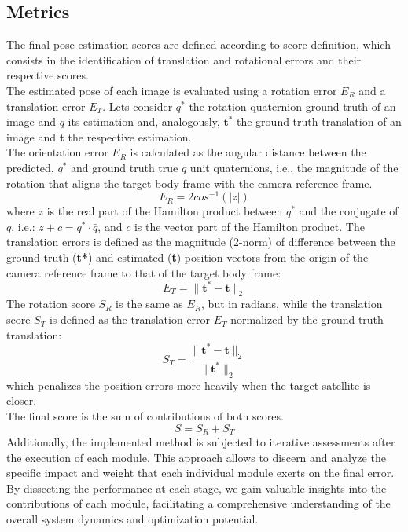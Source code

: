 \subsection{Metrics}
The final pose estimation scores are defined according to \cite{KPEC} score definition, which consists in the identification of translation and rotational errors and their respective scores.\\
The estimated pose of each image is evaluated using a rotation error $E_R$ and a translation error $E_T$. Lets consider $q^*$ the rotation quaternion ground truth of an image and $q$ its estimation and, analogously, $\textbf{t}^*$ the ground truth translation of an image and $\textbf{t}$ the respective estimation.\\
The orientation error $E_R$ is calculated as the angular distance between the predicted, $q^*$ and ground truth true $q$ unit quaternions, i.e., the magnitude of the rotation that aligns the target body frame with the camera reference frame.
\begin{equation}
    E_R = 2cos^{-1}(|z|)
\end{equation}
where $z$ is the real part of the Hamilton product between $q^*$ and the conjugate of $q$, i.e.: \(z + c = q^*\cdot \bar{q}\), and $c$ is the vector part of the Hamilton product.
The translation errors is defined as the magnitude (2-norm) of difference between the ground-truth (\textbf{t*}) and estimated (\textbf{t}) position vectors from the origin of the camera reference frame to that of the target body frame:
\begin{equation}
    E_T = \|\textbf{t}^*-\textbf{t}\|_2
\end{equation}
The rotation score $S_R$ is the same as $E_R$, but in radians, while the translation score $S_T$ is defined as the translation error $E_T$ normalized by the ground truth translation:
\begin{equation}
    S_T = \frac{\|\textbf{t}^*-\textbf{t}\|_2}{\|\textbf{t}^*\|_2}
\end{equation}
which penalizes the position errors more heavily when the target satellite is closer.\\
The final score is the sum of contributions of both scores.
\begin{equation}
    S = S_R + S_T
\end{equation}
Additionally, the implemented method is subjected to iterative assessments after the execution of each module. This approach allows to discern and analyze the specific impact and weight that each individual module exerts on the final error. By dissecting the performance at each stage, we gain valuable insights into the contributions of each module, facilitating a comprehensive understanding of the overall system dynamics and optimization potential.

